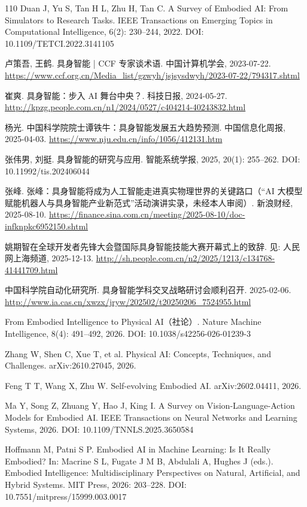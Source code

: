 \documentclass[10pt,fontset=fandol]{ctexart}
\begin{document}
\begin{thebibliography}{110}
Duan J, Yu S, Tan H L, Zhu H, Tan C. A Survey of Embodied AI: From Simulators to Research Tasks. IEEE Transactions on Emerging Topics in Computational Intelligence, 6(2): 230–244, 2022. DOI: 10.1109/TETCI.2022.3141105

卢策吾, 王鹤. 具身智能 | CCF 专家谈术语. 中国计算机学会, 2023-07-22. \url{https://www.ccf.org.cn/Media\_list/gzwyh/jsjsysdwyh/2023-07-22/794317.shtml}

崔爽. 具身智能：步入 AI 舞台中央？. 科技日报, 2024-05-27. \url{http://kpzg.people.com.cn/n1/2024/0527/c404214-40243832.html}

杨光. 中国科学院院士谭铁牛：具身智能发展五大趋势预测. 中国信息化周报, 2025-04-03. \url{https://www.nju.edu.cn/info/1056/412131.htm}

张伟男, 刘挺. 具身智能的研究与应用. 智能系统学报, 2025, 20(1): 255–262. DOI: 10.11992/tis.202406044

张峰. 张峰：具身智能将成为人工智能走进真实物理世界的关键路口（“AI 大模型赋能机器人与具身智能产业新范式”活动演讲实录，未经本人审阅）. 新浪财经, 2025-08-10. \url{https://finance.sina.com.cn/meeting/2025-08-10/doc-infknpkc6952150.shtml}

姚期智在全球开发者先锋大会暨国际具身智能技能大赛开幕式上的致辞. 见: 人民网上海频道, 2025-12-13. \url{http://sh.people.com.cn/n2/2025/1213/c134768-41441709.html}

中国科学院自动化研究所. 具身智能学科交叉战略研讨会顺利召开. 2025-02-06. \url{http://www.ia.cas.cn/xwzx/jryw/202502/t20250206\_7524955.html}

From Embodied Intelligence to Physical AI（社论）. Nature Machine Intelligence, 8(4): 491–492, 2026. DOI: 10.1038/s42256-026-01239-3

Zhang W, Shen C, Xue T, et al. Physical AI: Concepts, Techniques, and Challenges. arXiv:2610.27045, 2026.

Feng T T, Wang X, Zhu W. Self-evolving Embodied AI. arXiv:2602.04411, 2026.

Ma Y, Song Z, Zhuang Y, Hao J, King I. A Survey on Vision-Language-Action Models for Embodied AI. IEEE Transactions on Neural Networks and Learning Systems, 2026. DOI: 10.1109/TNNLS.2025.3650584

Hoffmann M, Patni S P. Embodied AI in Machine Learning: Is It Really Embodied? In: Macrine S L, Fugate J M B, Abdulali A, Hughes J (eds.). Embodied Intelligence: Multidisciplinary Perspectives on Natural, Artificial, and Hybrid Systems. MIT Press, 2026: 203–228. DOI: 10.7551/mitpress/15999.003.0017


\end{thebibliography}
\end{document}
